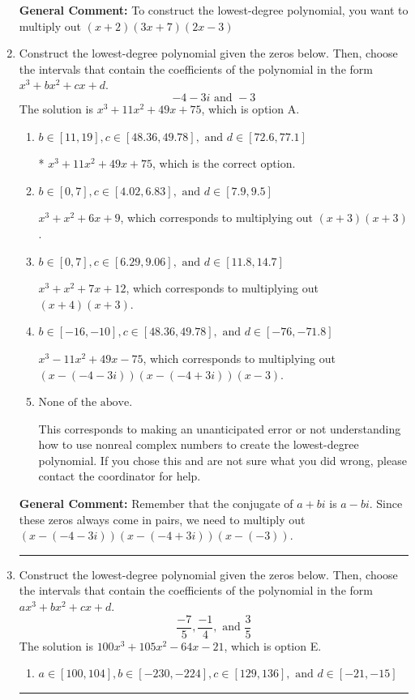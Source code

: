 \documentclass{extbook}[14pt]
\newcommand{\litem}[1]{\item #1

\rule{\textwidth}{0.4pt}}
\begin{document}
\begin{enumerate}
{\textbf{General Comment:} To construct the lowest-degree polynomial, you want to multiply out $(x + 2)(3x + 7)(2x -3)$
}
\litem{
Construct the lowest-degree polynomial given the zeros below. Then, choose the intervals that contain the coefficients of the polynomial in the form $x^3+bx^2+cx+d$.
\[ -4 - 3 i \text{ and } -3 \]The solution is \( x^{3} +11 x^{2} +49 x + 75 \), which is option A.\begin{enumerate}[label=\Alph*.]
\item \( b \in [11, 19], c \in [48.36, 49.78], \text{ and } d \in [72.6, 77.1] \)

* $x^{3} +11 x^{2} +49 x + 75$, which is the correct option.
\item \( b \in [0, 7], c \in [4.02, 6.83], \text{ and } d \in [7.9, 9.5] \)

$x^{3} + x^{2} +6 x + 9$, which corresponds to multiplying out $(x + 3)(x + 3)$.
\item \( b \in [0, 7], c \in [6.29, 9.06], \text{ and } d \in [11.8, 14.7] \)

$x^{3} + x^{2} +7 x + 12$, which corresponds to multiplying out $(x + 4)(x + 3)$.
\item \( b \in [-16, -10], c \in [48.36, 49.78], \text{ and } d \in [-76, -71.8] \)

$x^{3} -11 x^{2} +49 x -75$, which corresponds to multiplying out $(x-(-4 - 3 i))(x-(-4 + 3 i))(x -3)$.
\item \( \text{None of the above.} \)

This corresponds to making an unanticipated error or not understanding how to use nonreal complex numbers to create the lowest-degree polynomial. If you chose this and are not sure what you did wrong, please contact the coordinator for help.
\end{enumerate}

\textbf{General Comment:} Remember that the conjugate of $a+bi$ is $a-bi$. Since these zeros always come in pairs, we need to multiply out $(x-(-4 - 3 i))(x-(-4 + 3 i))(x-(-3))$.
}
\litem{
Construct the lowest-degree polynomial given the zeros below. Then, choose the intervals that contain the coefficients of the polynomial in the form $ax^3+bx^2+cx+d$.
\[ \frac{-7}{5}, \frac{-1}{4}, \text{ and } \frac{3}{5} \]The solution is \( 100x^{3} +105 x^{2} -64 x -21 \), which is option E.\begin{enumerate}[label=\Alph*.]
\item \( a \in [100, 104], b \in [-230, -224], c \in [129, 136], \text{ and } d \in [-21, -15] \)


\end{enumerate}}
\end{enumerate}
\end{document}
